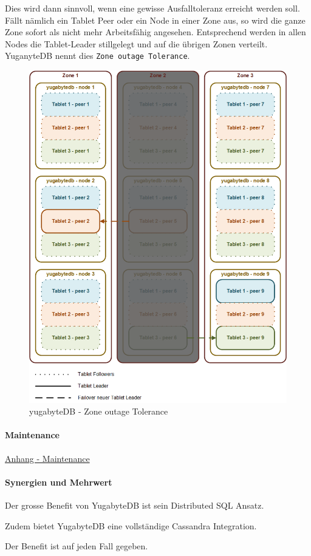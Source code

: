\begin{flushleft}
    Dies wird dann sinnvoll, wenn eine gewisse Ausfalltoleranz erreicht werden soll.
    Fällt nämlich ein Tablet Peer oder ein Node in einer Zone aus, so wird die ganze Zone sofort als nicht mehr Arbeitsfähig angesehen.
    Entsprechend werden in allen Nodes die Tablet-Leader stillgelegt und auf die übrigen Zonen verteilt.
    YuganyteDB nennt dies \texttt{Zone outage Tolerance}\cite{PTKCP8A4}.
    \begin{figure}[H]
        \centering
        \includegraphics[width=0.8\linewidth]{source/implementation/evaluation/postgresql_ha_solutions/yugabytedb/yugabytedb-zone-outage-tolerance}
        \caption{yugabyteDB - Zone outage Tolerance}
        \label{fig:yugabytedb-zone-outage-tolerance}
    \end{figure}
\end{flushleft}
\begin{flushleft}
    \paragraph{Maintenance}
    \hyperref[subsec:maintenance_patroni]{Anhang - Maintenance}

\end{flushleft}
\begin{flushleft}
    \paragraph{Synergien und Mehrwert}
    Der grosse Benefit von YugabyteDB ist sein Distributed SQL Ansatz.
\end{flushleft}
\begin{flushleft}
    Zudem bietet YugabyteDB eine vollständige \Gls{Cassandra} Integration.\\
\end{flushleft}
\begin{flushleft}
    Der Benefit ist auf jeden Fall gegeben.
\end{flushleft}

